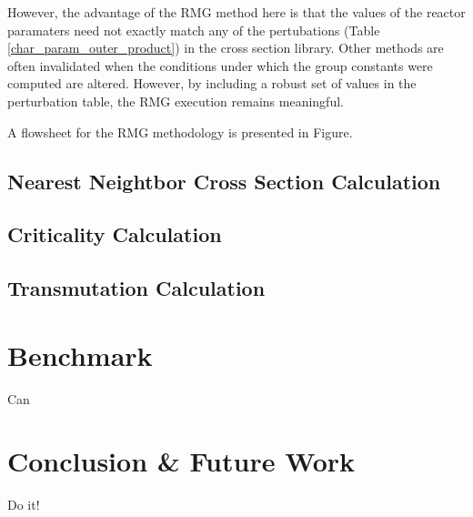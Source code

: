 However, the advantage of the RMG method here is that the values of the reactor paramaters
need not exactly match any of the pertubations (Table \ref{char_param_outer_product}) in the 
cross section library.  Other methods are often invalidated when the conditions under which 
the group constants were computed are altered.  However, by including a robust set of values
in the perturbation table, the RMG execution remains meaningful.

A flowsheet for the RMG methodology is presented in Figure.

\subsection{Nearest Neightbor Cross Section Calculation}

\subsection{Criticality Calculation}

\subsection{Transmutation Calculation}



\section{Benchmark}
Can

\section{Conclusion \& Future Work}
Do it!

